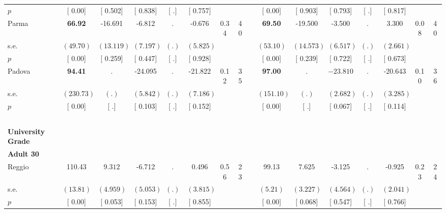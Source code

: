 \begin{longtable}{L{8em} c c c c c c c p{1em} c c c c c c c}
\quad \quad \quad \quad $ p$ & [     0.00] & [    0.502] & [    0.838] & [        .] & [    0.757] & & & & [     0.00] & [    0.903] & [    0.793] & [        .] & [    0.817] & &  \\[1em]
\quad \quad \quad Parma& \textbf{    66.92} &   -16.691 &    -6.812 &         . &    -0.676 &      0.34 &        40 & & \textbf{    69.50} &   -19.500 &    -3.500 &         . &     3.300 &      0.08 &        40  \\*
\quad \quad \quad \quad s.e.& $ (    49.70)$ & $ (   13.119)$ & $ (    7.197)$ & $ (        .)$ & $ (    5.825)$ & & & & $ (    53.10)$ & $ (   14.573)$ & $ (    6.517)$ & $ (        .)$ & $ (    2.661)$ & &  \\*
\quad \quad \quad \quad $ p$ & [     0.00] & [    0.259] & [    0.447] & [        .] & [    0.928] & & & & [     0.00] & [    0.239] & [    0.722] & [        .] & [    0.673] & &  \\[1em]
\quad \quad \quad Padova& \textbf{    94.41} &         . &   -24.095 &         . &   -21.822 &      0.12 &        35 & & \textbf{    97.00} &         . & $ \mathbf{  -23.810}$ &         . &   -20.643 &      0.10 &        36  \\*
\quad \quad \quad \quad s.e.& $ (   230.73)$ & $ (        .)$ & $ (    5.842)$ & $ (        .)$ & $ (    7.186)$ & & & & $ (   151.10)$ & $ (        .)$ & $ (    2.682)$ & $ (        .)$ & $ (    3.285)$ & &  \\*
\quad \quad \quad \quad $ p$ & [     0.00] & [        .] & [    0.103] & [        .] & [    0.152] & & & & [     0.00] & [        .] & [    0.067] & [        .] & [    0.114] & &  \\[1em]
~\\[1em]
\textbf{University Grade} \\*
\quad \quad \textbf{Adult 30} & & & & & & & & & & & & & & & \\* 
\quad \quad \quad Reggio& 110.43 & $ \mathbf{    9.312}$ &    -6.712 &         . &     0.496 &      0.56 &        23 & & 99.13 & $ \mathbf{    7.625}$ &    -3.125 &         . &    -0.925 &      0.23 &        24  \\*
\quad \quad \quad \quad s.e.& $ (    13.81)$ & $ (    4.959)$ & $ (    5.053)$ & $ (        .)$ & $ (    3.815)$ & & & & $ (     5.21)$ & $ (    3.227)$ & $ (    4.564)$ & $ (        .)$ & $ (    2.041)$ & &  \\*
\quad \quad \quad \quad $ p$ & [     0.00] & [    0.053] & [    0.153] & [        .] & [    0.855] & & & & [     0.00] & [    0.068] & [    0.547] & [        .] & [    0.766] & &  \\[1em]

\end{longtable}
